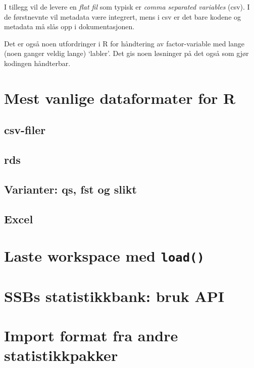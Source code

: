 \documentclass[
  letterpaper,
  DIV=11,
  numbers=noendperiod]{scrreprt}
\begin{document}
I tillegg vil de levere en \emph{flat fil} som typisk er \emph{comma
separated variables} (csv). I de førstnevnte vil metadata være
integrert, mens i csv er det bare kodene og metadata må slås opp i
dokumentasjonen.

Det er også noen utfordringer i R for håndtering av factor-variable med
lange (noen ganger veldig lange) `labler'. Det gis noen løsninger på det
også som gjør kodingen håndterbar.

\hypertarget{mest-vanlige-dataformater-for-r}{%
\section{Mest vanlige dataformater for
R}\label{mest-vanlige-dataformater-for-r}}

\hypertarget{csv-filer}{%
\subsection{csv-filer}\label{csv-filer}}

\hypertarget{rds}{%
\subsection{rds}\label{rds}}

\hypertarget{varianter-qs-fst-og-slikt}{%
\subsection{Varianter: qs, fst og
slikt}\label{varianter-qs-fst-og-slikt}}

\hypertarget{excel}{%
\subsection{Excel}\label{excel}}

\hypertarget{laste-workspace-med-load}{%
\section{\texorpdfstring{Laste workspace med
\texttt{load()}}{Laste workspace med load()}}\label{laste-workspace-med-load}}

\hypertarget{ssbs-statistikkbank-bruk-api}{%
\section{SSBs statistikkbank: bruk
API}\label{ssbs-statistikkbank-bruk-api}}

\hypertarget{import-format-fra-andre-statistikkpakker}{%
\section{Import format fra andre
statistikkpakker}\label{import-format-fra-andre-statistikkpakker}}
\end{document}
